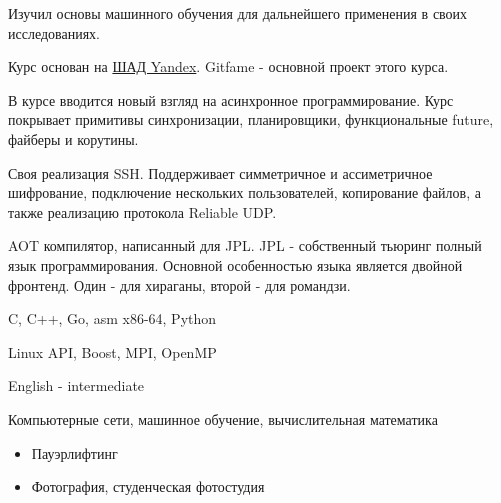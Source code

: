 
Изучил основы машинного обучения для дальнейшего применения в своих исследованиях.
\medskip

Курс основан на \href{https://shad.yandex.ru}{ШАД Yandex}. Gitfame - основной проект этого курса.
\medskip

В курсе вводится новый взгляд на асинхронное программирование.
Курс покрывает примитивы синхронизации, планировщики, функциональные future, файберы и корутины.
\medskip

Своя реализация SSH. Поддерживает симметричное и ассиметричное шифрование,
подключение нескольких пользователей, копирование файлов, а также реализацию протокола Reliable UDP.
\medskip

AOT компилятор, написанный для JPL. JPL - собственный тьюринг полный язык программирования.
Основной особенностью языка является двойной фронтенд. Один - для хираганы, второй - для романдзи.

\divider

C, C++, Go, asm x86-64, Python
\medskip

Linux API, Boost, MPI, OpenMP
\medskip

English - intermediate
\medskip

Компьютерные сети, машинное обучение, вычислительная математика

\divider

\begin{itemize}
    \item Пауэрлифтинг
    \item Фотография, студенческая фотостудия
\end{itemize}

\divider

